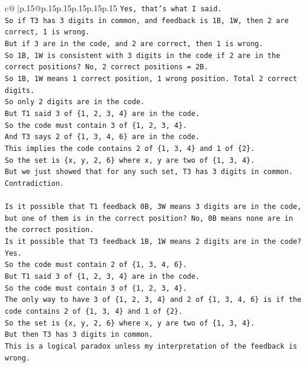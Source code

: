 \documentclass{article}
\begin{document}
{\begin{supertabular}{c@{$\;$}|p{.15\linewidth}@{}p{.15\linewidth}p{.15\linewidth}p{.15\linewidth}p{.15\linewidth}p{.15\linewidth}}
{{{\texttt{Yes, that's what I said.} \\
\texttt{So if T3 has 3 digits in common, and feedback is 1B, 1W, then 2 are correct, 1 is wrong.} \\
\texttt{But if 3 are in the code, and 2 are correct, then 1 is wrong.} \\
\texttt{So 1B, 1W is consistent with 3 digits in the code if 2 are in the correct positions? No, 2 correct positions = 2B.} \\
\texttt{So 1B, 1W means 1 correct position, 1 wrong position. Total 2 correct digits.} \\
\texttt{So only 2 digits are in the code.} \\
\texttt{But T1 said 3 of \{1, 2, 3, 4\} are in the code.} \\
\texttt{So the code must contain 3 of \{1, 2, 3, 4\}.} \\
\texttt{And T3 says 2 of \{1, 3, 4, 6\} are in the code.} \\
\texttt{This implies the code contains 2 of \{1, 3, 4\} and 1 of \{2\}.} \\
\texttt{So the set is \{x, y, 2, 6\} where x, y are two of \{1, 3, 4\}.} \\
\texttt{But we just showed that for any such set, T3 has 3 digits in common.} \\
\texttt{Contradiction.} \\
\\ 
\texttt{Is it possible that T1 feedback 0B, 3W means 3 digits are in the code, but one of them is in the correct position? No, 0B means none are in the correct position.} \\
\texttt{Is it possible that T3 feedback 1B, 1W means 2 digits are in the code? Yes.} \\
\texttt{So the code must contain 2 of \{1, 3, 4, 6\}.} \\
\texttt{But T1 said 3 of \{1, 2, 3, 4\} are in the code.} \\
\texttt{So the code must contain 3 of \{1, 2, 3, 4\}.} \\
\texttt{The only way to have 3 of \{1, 2, 3, 4\} and 2 of \{1, 3, 4, 6\} is if the code contains 2 of \{1, 3, 4\} and 1 of \{2\}.} \\
\texttt{So the set is \{x, y, 2, 6\} where x, y are two of \{1, 3, 4\}.} \\
\texttt{But then T3 has 3 digits in common.} \\
\texttt{This is a logical paradox unless my interpretation of the feedback is wrong.} \\
}}}
\end{supertabular}}
\end{document}
